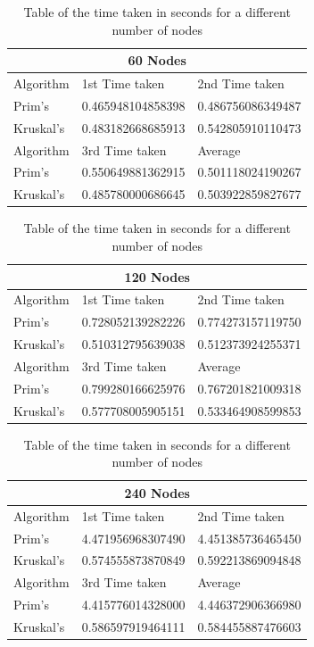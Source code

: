 \documentclass[twocolumn]{article}
\begin{document}
\begin{table}[H]
\caption{Table of the time taken in seconds for a different number of nodes}
\label{table:increasingnumber}
\centering
\tiny
\begin{tabular}{|l|l|l|}
\toprule
\multicolumn{3}{c}{\textbf{60 Nodes}} \\
\midrule
Algorithm & 1st Time taken & 2nd Time taken \\
\hline
Prim's & 0.465948104858398 & 0.486756086349487 \\
\hline
Kruskal's & 0.483182668685913 & 0.542805910110473 \\
\hline
Algorithm & 3rd Time taken & Average \\
\hline
Prim's & 0.550649881362915 & \color{teal}0.501118024190267 \\
\hline
Kruskal's & 0.485780000686645 & 0.503922859827677 \\
\bottomrule
\end{tabular}

\centering
\tiny
\begin{tabular}{|l|l|l|}
\toprule
\multicolumn{3}{c}{\textbf{120 Nodes}} \\
\midrule
Algorithm & 1st Time taken & 2nd Time taken \\
\hline
Prim's & 0.728052139282226 & 0.774273157119750 \\
\hline
Kruskal's & 0.510312795639038 & 0.512373924255371 \\
\hline
Algorithm & 3rd Time taken & Average \\
\hline
Prim's & 0.799280166625976 & 0.767201821009318 \\
\hline
Kruskal's & 0.577708005905151 & \color{teal}0.533464908599853 \\
\bottomrule
\end{tabular}

\centering
\tiny
\begin{tabular}{|l|l|l|}
\toprule
\multicolumn{3}{c}{\textbf{240 Nodes}} \\
\midrule
Algorithm & 1st Time taken & 2nd Time taken \\
\hline
Prim's & 4.471956968307490 & 4.451385736465450 \\
\hline
Kruskal's & 0.574555873870849 & 0.592213869094848 \\
\hline
Algorithm & 3rd Time taken & Average \\
\hline
Prim's & 4.415776014328000 & 4.446372906366980 \\
\hline
Kruskal's & 0.586597919464111 & \color{teal}0.584455887476603 \\
\bottomrule
\end{tabular}

\end{table}
\end{document}
